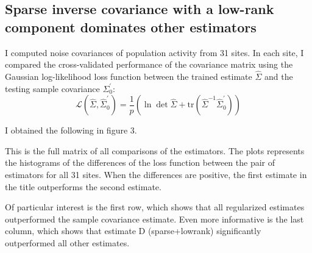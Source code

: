 \subsection*{Sparse inverse covariance with a low-rank component dominates other estimators}
I computed noise covariances of population activity from 31 sites.  In each site, I compared the cross-validated performance of the covariance matrix using the Gaussian log-likelihood loss function between the trained estimate $ \hat\Sigma$ and the testing sample covariance $ \Sigma_0^\prime$:
\begin{equation}
\mathcal L(\hat\Sigma,\hat\Sigma_0^\prime) = 
\frac 1 p\left( \ln \det \hat \Sigma + \mbox{tr}(\hat \Sigma^{-1}\hat\Sigma_0^\prime) \right) 
\end{equation}

I obtained the following in figure 3.

This is the full matrix of all comparisons of the estimators.  The plots represents the histograms of the differences of the loss function between the pair of estimators for all 31 sites.  When the differences are positive, the first estimate in the title outperforms the second estimate.

Of particular interest is the first row, which shows that all regularized estimates  outperformed the sample covariance estimate.  Even more informative is the last column, which shows that estimate D (sparse+lowrank) significantly outperformed all other estimates.



